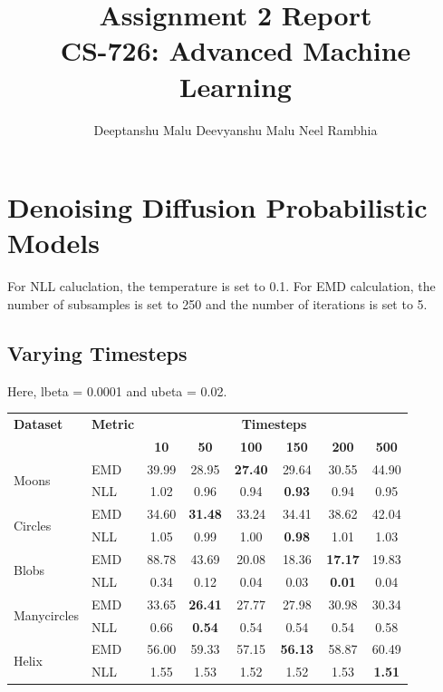 \documentclass[11pt]{article}
\title{Assignment 2 Report\\
    CS-726: Advanced Machine Learning}
\author{Deeptanshu Malu \quad Deevyanshu Malu \quad Neel Rambhia}
\date{}
\begin{document}
\maketitle

\section{Denoising Diffusion Probabilistic Models}
For NLL caluclation, the temperature is set to 0.1.
For EMD calculation, the number of subsamples is set to 250 and the number of iterations is set to 5.

\subsection{Varying Timesteps}
Here, lbeta = 0.0001 and ubeta = 0.02.

\begin{longtable}{|l|l|c|c|c|c|c|c|}
    \hline
    \textbf{Dataset} & \textbf{Metric} & \multicolumn{6}{c|}{\textbf{Timesteps}} \\
    \cline{3-8}
    & & \textbf{10} & \textbf{50} & \textbf{100} & \textbf{150} & \textbf{200} & \textbf{500} \\
    \hline
    \multirow{2}{*}{Moons} & EMD & 39.99 & 28.95 & \textbf{27.40} & 29.64 & 30.55 & 44.90 \\
    \cline{2-8}
    & NLL & 1.02 & 0.96 & 0.94 & \textbf{0.93} & 0.94 & 0.95 \\
    \hline
    \multirow{2}{*}{Circles} & EMD & 34.60 & \textbf{31.48} & 33.24 & 34.41 & 38.62 & 42.04 \\
    \cline{2-8}
    & NLL & 1.05 & 0.99 & 1.00 & \textbf{0.98} & 1.01 & 1.03 \\
    \hline
    \multirow{2}{*}{Blobs} & EMD & 88.78 & 43.69 & 20.08 & 18.36 & \textbf{17.17} & 19.83 \\
    \cline{2-8}
    & NLL & 0.34 & 0.12 & 0.04 & 0.03 & \textbf{0.01} & 0.04 \\
    \hline
    \multirow{2}{*}{Manycircles} & EMD & 33.65 & \textbf{26.41} & 27.77 & 27.98 & 30.98 & 30.34 \\
    \cline{2-8}
    & NLL & 0.66 & \textbf{0.54} & 0.54 & 0.54 & 0.54 & 0.58 \\
    \hline
    \multirow{2}{*}{Helix} & EMD & 56.00 & 59.33 & 57.15 & \textbf{56.13} & 58.87 & 60.49 \\
    \cline{2-8}
    & NLL & 1.55 & 1.53 & 1.52 & 1.52 & 1.53 & \textbf{1.51} \\
    \hline
\end{longtable}
\end{document}

